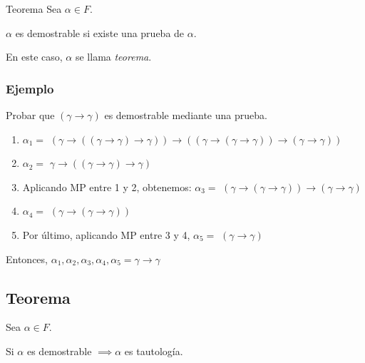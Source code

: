 \medskip

\begin{definicion}{Teorema}{}
    Sea $\alpha \in F$.

    \medskip

    $\alpha$ es demostrable si existe una prueba de $\alpha$.

    \bigskip
    En este caso, $\alpha$ se llama \textit{teorema}.
\end{definicion}

\subsubsection{Ejemplo}

Probar que $(\gamma \to \gamma)$ es demostrable mediante una prueba.

\begin{enumerate}
    \item $\alpha_1=$ $(\gamma \to ((\gamma \to \gamma) \to \gamma )) 
        \to 
        ((\gamma \to (\gamma \to \gamma))\to (\gamma \to \gamma))$

    \item $\alpha_2=$ $\gamma \to ( (\gamma \to \gamma) \to \gamma)$

    \item Aplicando MP entre 1 y 2, obtenemos:
        $\alpha_3=$ $(\gamma \to (\gamma \to \gamma)) \to (\gamma \to \gamma)$

    \item $\alpha_4=$ $(\gamma \to (\gamma \to \gamma))$

    \item Por último, aplicando MP entre 3 y 4, 
        $\alpha_5=$ $(\gamma \to \gamma)$
\end{enumerate}

Entonces, $\alpha_1, \alpha_2, \alpha_3, \alpha_4, \alpha_5=\gamma \to \gamma$

\subsection{Teorema}


\begin{teorema}{}{}
    Sea $\alpha \in F$.

    \medskip

    Si $\alpha$ es demostrable $\implies \alpha$ es tautología.
\end{teorema}

